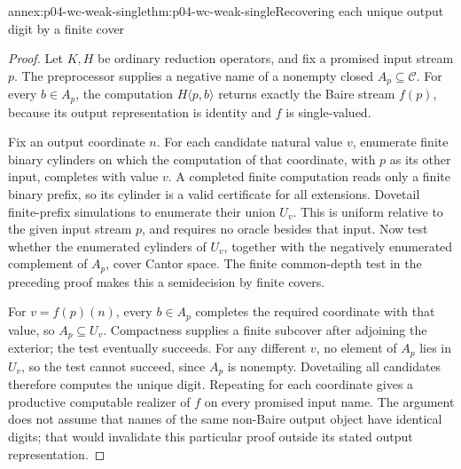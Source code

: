 \begin{annexitem}{annex:p04-wc-weak-single}{thm:p04-wc-weak-single}{Recovering each unique output digit by a finite cover}
\begin{proof}
Let \(K,H\) be ordinary reduction operators, and fix a promised input
stream \(p\). The preprocessor supplies a negative name of a
nonempty closed \(A_p\subseteq\mathcal C\).
For every \(b\in A_p\), the computation
\(H\langle p,b\rangle\) returns exactly the Baire stream \(f(p)\),
because its output representation is identity and \(f\) is single-valued.

Fix an output coordinate \(n\). For each candidate natural value
\(v\), enumerate finite binary cylinders on which the computation
of that coordinate, with \(p\) as its other input, completes with
value \(v\). A completed finite computation reads only a finite
binary prefix, so its cylinder is a valid certificate for all
extensions. Dovetail finite-prefix simulations to enumerate their
union \(U_v\). This is uniform relative to the given input stream
\(p\), and requires no oracle besides that input.
Now test whether the enumerated cylinders of \(U_v\), together with
the negatively enumerated complement of \(A_p\), cover Cantor space.
The finite common-depth test in the preceding proof makes this a
semidecision by finite covers.

For \(v=f(p)(n)\), every \(b\in A_p\) completes the required
coordinate with that value, so \(A_p\subseteq U_v\).
Compactness supplies a finite subcover after adjoining the exterior;
the test eventually succeeds. For any different \(v\), no element
of \(A_p\) lies in \(U_v\), so the test cannot succeed, since
\(A_p\) is nonempty. Dovetailing all candidates therefore computes
the unique digit. Repeating for each coordinate gives a productive
computable realizer of \(f\) on every promised input name.
The argument does not assume that names of the same non-Baire
output object have identical digits; that would invalidate this
particular proof outside its stated output representation.
\end{proof}
\end{annexitem}

